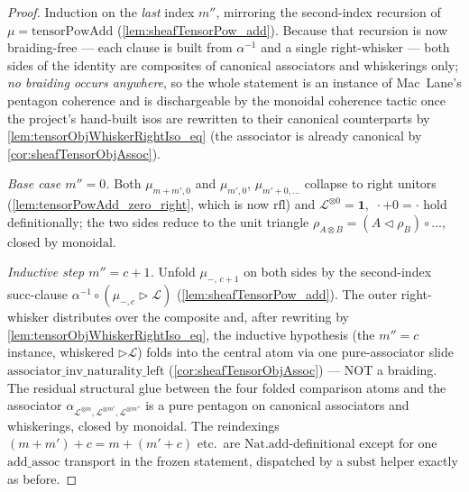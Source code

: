 \begin{proof}
  \leanok
  Induction on the \emph{last} index \(m''\), mirroring the second-index recursion
  of \(\mu = \mathrm{tensorPowAdd}\) (\cref{lem:sheafTensorPow_add}). Because that
  recursion is now braiding-free --- each clause is built from \(\alpha^{-1}\) and a
  single right-whisker --- both sides of the identity are composites of canonical
  associators and whiskerings only; \emph{no braiding occurs anywhere}, so the whole
  statement is an instance of Mac~Lane's pentagon coherence and is dischargeable by
  the \(\mathrm{monoidal}\) coherence tactic once the project's hand-built isos are
  rewritten to their canonical counterparts by \cref{lem:tensorObjWhiskerRightIso_eq}
  (the associator is already canonical by \cref{cor:sheafTensorObjAssoc}).

  \emph{Base case \(m'' = 0\).} Both \(\mu_{m+m',0}\) and \(\mu_{m',0}\),
  \(\mu_{m'+0,\dots}\) collapse to right unitors (\cref{lem:tensorPowAdd_zero_right},
  which is now \(\mathrm{rfl}\)) and \(\mathcal{L}^{\otimes 0} = \mathbf{1}\), \(\,\cdot
  + 0 = \cdot\) hold definitionally; the two sides reduce to the unit triangle
  \(\rho_{A\otimes B} = (A \lhd \rho_B)\circ\dots\), closed by \(\mathrm{monoidal}\).

  \emph{Inductive step \(m'' = c+1\).} Unfold \(\mu_{-,\,c+1}\) on both sides by the
  second-index succ-clause \(\alpha^{-1}\circ(\mu_{-,c}\rhd\mathcal{L})\)
  (\cref{lem:sheafTensorPow_add}). The outer right-whisker distributes over the
  composite and, after rewriting by \cref{lem:tensorObjWhiskerRightIso_eq}, the
  inductive hypothesis (the \(m''=c\) instance, whiskered \(\rhd\mathcal{L}\)) folds
  into the central atom via one pure-associator slide
  \(\mathrm{associator\_inv\_naturality\_left}\) (\cref{cor:sheafTensorObjAssoc}) ---
  NOT a braiding. The residual structural glue between the four folded comparison
  atoms and the associator \(\alpha_{\mathcal{L}^{\otimes m},\mathcal{L}^{\otimes
  m'},\mathcal{L}^{\otimes m''}}\) is a pure pentagon on canonical associators and
  whiskerings, closed by \(\mathrm{monoidal}\). The reindexings \((m+m')+c =
  m+(m'+c)\) etc.\ are \(\mathrm{Nat.add}\)-definitional except for one
  \(\mathrm{add\_assoc}\) transport in the frozen statement, dispatched by a
  \(\mathrm{subst}\) helper exactly as before.
\end{proof}

